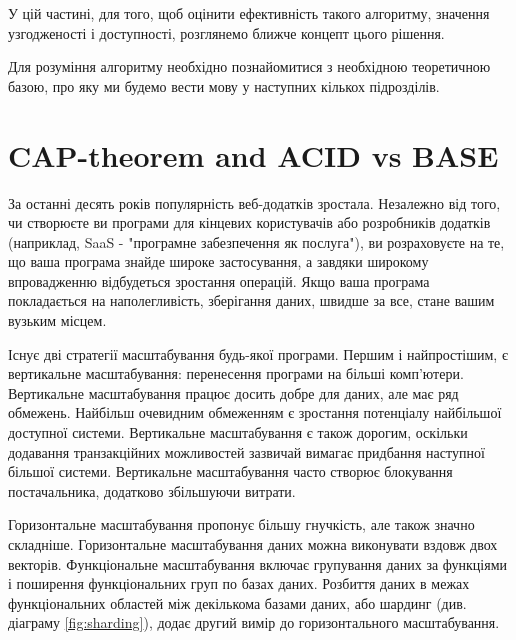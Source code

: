 \documentclass[14pt]{vakthesis}
\begin{document}
У цій частині, для того, щоб оцінити ефективність такого алгоритму, значення узгодженості і доступності, розглянемо ближче концепт цього рішення.

Для розуміння алгоритму необхідно познайомитися з необхідною теоретичною базою, про яку ми будемо вести мову у наступних кількох підрозділів.

\section{CAP-theorem and ACID vs BASE}

За останні десять років популярність веб-додатків зростала. Незалежно від того, чи створюєте ви програми для кінцевих користувачів або розробників додатків (наприклад, SaaS - "програмне забезпечення як послуга"), ви розраховуєте на те, що ваша програма знайде широке застосування, а завдяки широкому впровадженню відбудеться зростання операцій. Якщо ваша програма покладається на наполегливість, зберігання даних, швидше за все, стане вашим вузьким місцем.

Існує дві стратегії масштабування будь-якої програми. Першим і найпростішим, є вертикальне масштабування: перенесення програми на більші комп'ютери. Вертикальне масштабування працює досить добре для даних, але має ряд обмежень. Найбільш очевидним обмеженням є зростання потенціалу найбільшої доступної системи. Вертикальне масштабування є також дорогим, оскільки додавання транзакційних можливостей зазвичай вимагає придбання наступної більшої системи. Вертикальне масштабування часто створює блокування постачальника, додатково збільшуючи витрати.

Горизонтальне масштабування пропонує більшу гнучкість, але також значно складніше. Горизонтальне масштабування даних можна виконувати вздовж двох векторів. Функціональне масштабування включає групування даних за функціями і поширення функціональних груп по базах даних. Розбиття даних в межах функціональних областей між декількома базами даних, або шардинг  (див. діаграму \ref{fig:sharding}), додає другий вимір до горизонтального масштабування.
\end{document}
